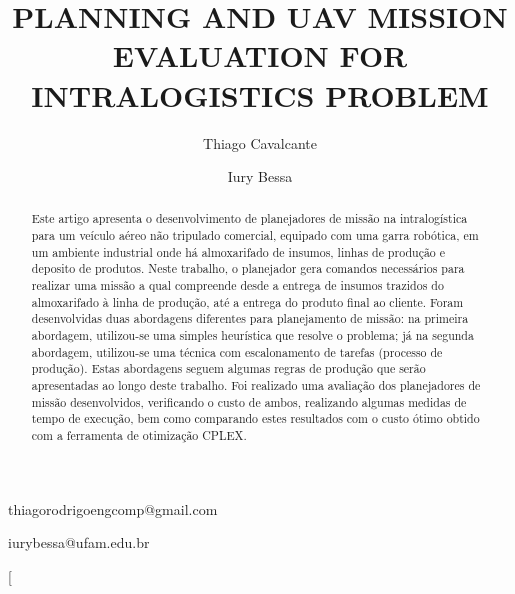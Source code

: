 \documentclass[conference,harvard,brazil,english]{sbatex}
\begin{document}

\title{PLANNING AND UAV MISSION EVALUATION FOR INTRALOGISTICS PROBLEM}

\author{Thiago Cavalcante}{thiagorodrigoengcomp@gmail.com}
\address{Graduate Program in Electrical and Computer Engineering, Federal University of Amazonas, Manaus, AM, Brazil}

\author{Iury Bessa}{iurybessa@ufam.edu.br}
\address{Department of Electricity, Federal University of Amazonas, Manaus, AM, Brazil}



\twocolumn[

\maketitle

\begin{abstract}
 Este artigo apresenta o desenvolvimento de planejadores de missão na intralogística para um veículo aéreo não tripulado comercial, equipado com uma garra robótica, em um ambiente industrial onde há almoxarifado de insumos, linhas de produção e deposito de produtos. Neste trabalho, o planejador gera comandos necessários para realizar uma missão a qual compreende desde a entrega de insumos trazidos do almoxarifado à linha de produção, até a entrega do produto final ao cliente. Foram desenvolvidas duas abordagens diferentes para planejamento de missão: na primeira abordagem, utilizou-se uma simples heurística que resolve o problema; já na segunda abordagem, utilizou-se uma técnica com escalonamento de tarefas (processo de produção). Estas abordagens seguem algumas regras de produção que serão apresentadas ao longo deste trabalho. Foi realizado uma avaliação dos planejadores de missão desenvolvidos, verificando o custo de ambos, realizando algumas medidas de tempo de execução, bem como comparando estes resultados com o custo ótimo obtido  com a ferramenta de otimização CPLEX.   \end{abstract}

\end{document}
